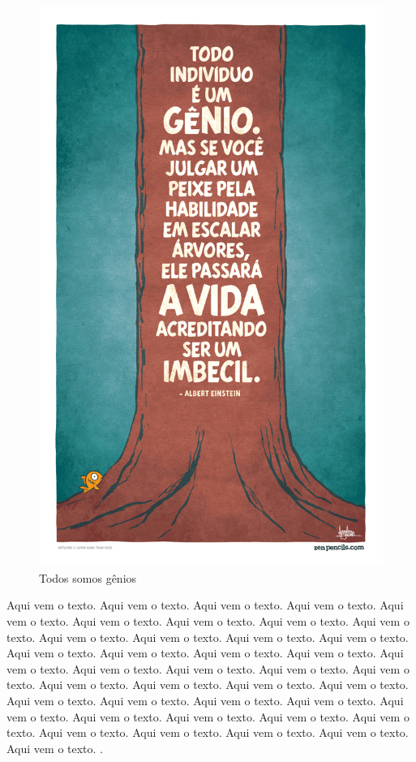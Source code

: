 \documentclass[12pt,a4paper]{article}
\begin{document}
	\begin{figure}[htb]
		\centering
		\includegraphics[scale=0.2]{todos-somos-genios.png}
		\caption{Todos somos gênios}
		\label{todos_somos_genios}
	\end{figure}
	
	Aqui vem o texto. Aqui vem o texto. Aqui vem o texto. Aqui vem o texto. Aqui vem o texto. Aqui vem o texto. Aqui vem o texto. Aqui vem o texto. Aqui vem o texto. Aqui vem o texto. Aqui vem o texto. Aqui vem o texto. Aqui vem o texto. Aqui vem o texto. Aqui vem o texto. Aqui vem o texto. Aqui vem o texto. Aqui vem o texto. Aqui vem o texto. Aqui vem o texto. Aqui vem o texto. Aqui vem o texto. Aqui vem o texto. Aqui vem o texto. Aqui vem o texto. Aqui vem o texto. Aqui vem o texto. Aqui vem o texto. Aqui vem o texto. Aqui vem o texto. Aqui vem o texto. Aqui vem o texto. Aqui vem o texto. Aqui vem o texto. Aqui vem o texto. Aqui vem o texto. Aqui vem o texto. Aqui vem o texto. Aqui vem o texto. Aqui vem o texto.	\cite{meulivro}.
	
\end{document}
